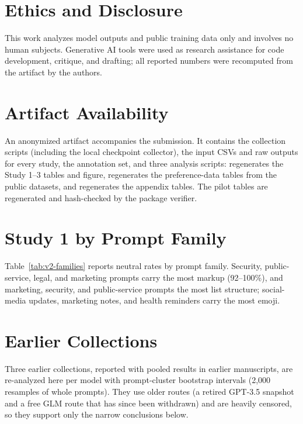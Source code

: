 \documentclass[acmsmall,screen,review,anonymous]{acmart}
\begin{document}
\section*{Ethics and Disclosure}

This work analyzes model outputs and public training data only and involves no human subjects. Generative AI tools were used as research assistance for code development, critique, and drafting; all reported numbers were recomputed from the artifact by the authors.

\section*{Artifact Availability}

An anonymized artifact accompanies the submission. It contains the collection scripts (including the local checkpoint collector), the input CSVs and raw outputs for every study, the annotation set, and three analysis scripts:  regenerates the Study 1--3 tables and figure,  regenerates the preference-data tables from the public datasets, and  regenerates the appendix tables. The pilot tables are regenerated and hash-checked by the package verifier.




\appendix

\section{Study 1 by Prompt Family}
\label{app:families}

Table~\ref{tab:v2-families} reports neutral rates by prompt family. Security, public-service, legal, and marketing prompts carry the most markup (92--100\%), and marketing, security, and public-service prompts the most list structure; social-media updates, marketing notes, and health reminders carry the most emoji.



\section{Earlier Collections}
\label{app:earlier}

Three earlier collections, reported with pooled results in earlier manuscripts, are re-analyzed here per model with prompt-cluster bootstrap intervals (2,000 resamples of whole prompts). They use older routes (a retired GPT-3.5 snapshot and a free GLM route that has since been withdrawn) and are heavily censored, so they support only the narrow conclusions below.
\end{document}
